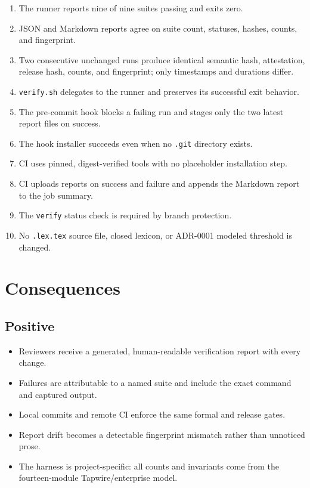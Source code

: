 \documentclass[11pt]{article}
\begin{document}
\begin{enumerate}
  \item The runner reports nine of nine suites passing and exits zero.
  \item JSON and Markdown reports agree on suite count, statuses, hashes, counts, and fingerprint.
  \item Two consecutive unchanged runs produce identical semantic hash, attestation, release hash,
        counts, and fingerprint; only timestamps and durations differ.
  \item \texttt{verify.sh} delegates to the runner and preserves its successful exit behavior.
  \item The pre-commit hook blocks a failing run and stages only the two latest report files on
        success.
  \item The hook installer succeeds even when no \texttt{.git} directory exists.
  \item CI uses pinned, digest-verified tools with no placeholder installation step.
  \item CI uploads reports on success and failure and appends the Markdown report to the job summary.
  \item The \texttt{verify} status check is required by branch protection.
  \item No \texttt{.lex.tex} source file, closed lexicon, or ADR-0001 modeled threshold is changed.
\end{enumerate}

\section{Consequences}

\subsection{Positive}

\begin{itemize}
  \item Reviewers receive a generated, human-readable verification report with every change.
  \item Failures are attributable to a named suite and include the exact command and captured output.
  \item Local commits and remote CI enforce the same formal and release gates.
  \item Report drift becomes a detectable fingerprint mismatch rather than unnoticed prose.
  \item The harness is project-specific: all counts and invariants come from the fourteen-module
        Tapwire/enterprise model.
\end{itemize}
\end{document}
